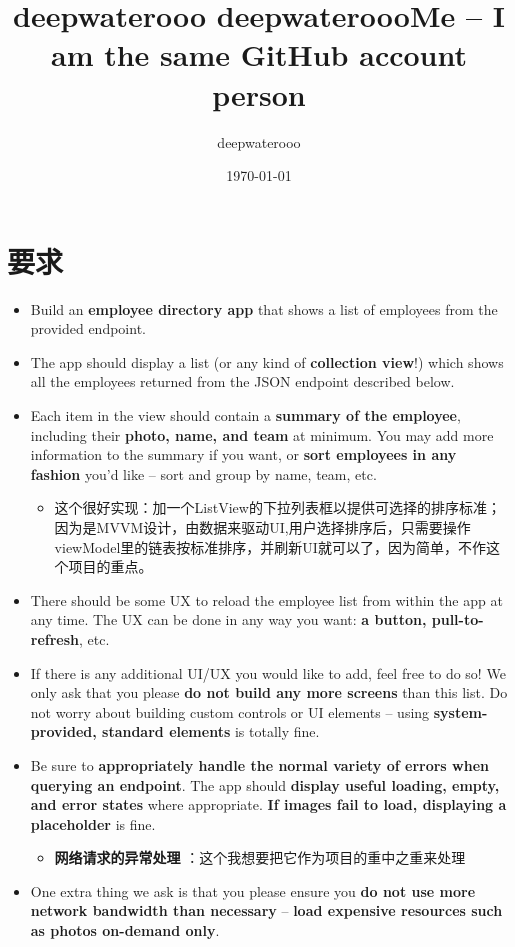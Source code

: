 \documentclass[9pt, b5paper]{article}
\author{deepwaterooo}
\date{\today}
\title{deepwaterooo deepwateroooMe -- I am the same GitHub account person}
\begin{document}
\maketitle
\tableofcontents


\section{要求}
\label{sec-1}
\begin{itemize}
\item Build an \textbf{employee directory app} that shows a list of employees from the provided endpoint.
\item The app should display a list (or any kind of \textbf{collection view}!) which shows all the employees returned from the JSON endpoint described below.
\item Each item in the view should contain a \textbf{summary of the employee}, including their \textbf{photo, name, and team} at minimum. You may add more information to the summary if you want, or \textbf{sort employees in any fashion} you’d like – sort and group by name, team, etc.
\begin{itemize}
\item 这个很好实现：加一个ListView的下拉列表框以提供可选择的排序标准；因为是MVVM设计，由数据来驱动UI,用户选择排序后，只需要操作viewModel里的链表按标准排序，并刷新UI就可以了，因为简单，不作这个项目的重点。
\end{itemize}
\item There should be some UX to reload the employee list from within the app at any time. The UX can be done in any way you want: \textbf{a button, pull-to-refresh}, etc.
\item If there is any additional UI/UX you would like to add, feel free to do so! We only ask that you please \textbf{do not build any more screens} than this list. Do not worry about building custom controls or UI elements – using \textbf{system-provided, standard elements} is totally fine.
\item Be sure to \textbf{appropriately handle the normal variety of errors when querying an endpoint}. The app should \textbf{display useful loading, empty, and error states} where appropriate. \textbf{If images fail to load, displaying a placeholder} is fine.
\begin{itemize}
\item \textbf{网络请求的异常处理} ：这个我想要把它作为项目的重中之重来处理
\end{itemize}
\item One extra thing we ask is that you please ensure you \textbf{do not use more network bandwidth than necessary} – \textbf{load expensive resources such as photos on-demand only}.

\end{itemize}
\end{document}
